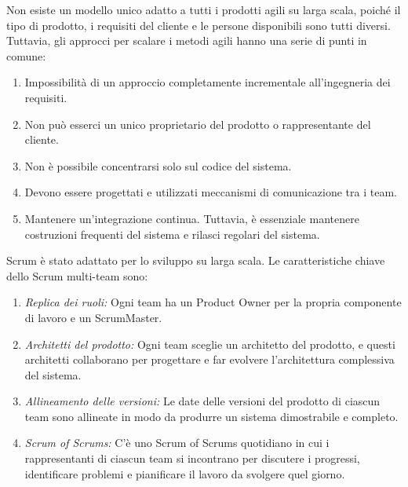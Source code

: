 Non esiste un modello unico adatto a tutti i prodotti agili su larga scala, poiché il tipo di prodotto, i requisiti del cliente e le persone disponibili sono tutti diversi. Tuttavia, gli approcci per scalare i metodi agili hanno una serie di punti in comune:
\begin{enumerate}
    \item Impossibilità di un approccio completamente incrementale all'ingegneria dei requisiti.
    \item Non può esserci un unico proprietario del prodotto o rappresentante del cliente. 
    \item Non è possibile concentrarsi solo sul codice del sistema. 
    \item Devono essere progettati e utilizzati meccanismi di comunicazione tra i team.
    \item Mantenere un'integrazione continua. Tuttavia, è essenziale mantenere costruzioni frequenti del sistema e rilasci regolari del sistema.
\end{enumerate}
Scrum è stato adattato per lo sviluppo su larga scala. Le caratteristiche chiave dello Scrum multi-team sono:
\begin{enumerate}
    \item \textit{Replica dei ruoli:} Ogni team ha un Product Owner per la propria componente di lavoro e un ScrumMaster.
    \item \textit{Architetti del prodotto:} Ogni team sceglie un architetto del prodotto, e questi architetti collaborano per progettare e far evolvere l'architettura complessiva del sistema.
    \item \textit{Allineamento delle versioni:} Le date delle versioni del prodotto di ciascun team sono allineate in modo da produrre un sistema dimostrabile e completo.
    \item \textit{Scrum of Scrums:} C'è uno Scrum of Scrums quotidiano in cui i rappresentanti di ciascun team si incontrano per discutere i progressi, identificare problemi e pianificare il lavoro da svolgere quel giorno.
\end{enumerate}

